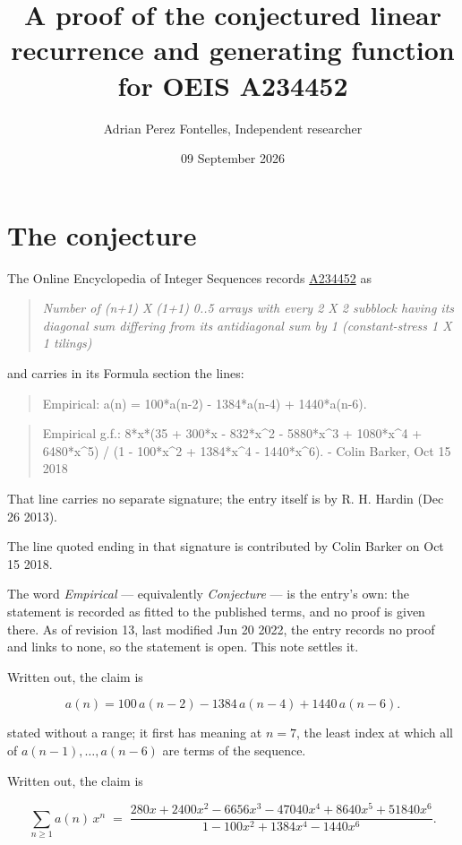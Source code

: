 \documentclass[11pt]{article}
\title{A proof of the conjectured linear recurrence and generating function for OEIS A234452}
\author{Adrian Perez Fontelles, Independent researcher}
\date{09 September 2026}
\theoremstyle{definition}
\begin{document}
\maketitle
\section{The conjecture}

The Online Encyclopedia of Integer Sequences records \href{https://oeis.org/A234452}{A234452} as

\begin{quote}\itshape Number of (n+1) X (1+1) 0..5 arrays with every 2 X 2 subblock having its diagonal sum differing from its antidiagonal sum by 1 (constant-stress 1 X 1 tilings)\end{quote}

and carries in its Formula section the lines:

\begin{quote}\ttfamily Empirical: a(n) = 100*a(n-2) - 1384*a(n-4) + 1440*a(n-6).\end{quote}

\begin{quote}\ttfamily Empirical g.f.: 8*x*(35 + 300*x - 832*x\textasciicircum{}2 - 5880*x\textasciicircum{}3 + 1080*x\textasciicircum{}4 + 6480*x\textasciicircum{}5) / (1 - 100*x\textasciicircum{}2 + 1384*x\textasciicircum{}4 - 1440*x\textasciicircum{}6). - Colin Barker, Oct 15 2018\end{quote}

That line carries no separate signature; the entry itself is by R. H. Hardin (Dec 26 2013).

The line quoted ending in that signature is contributed by Colin Barker on Oct 15 2018.

The word {\itshape Empirical} --- equivalently {\itshape Conjecture} --- is the entry's own: the statement is recorded as fitted to the published terms, and no proof is given there. As of revision 13, last modified Jun 20 2022, the entry records no proof and links to none, so the statement is open. This note settles it.

Written out, the claim is

\[a(n) = 100\,a(n-2) - 1384\,a(n-4) + 1440\,a(n-6).\]

stated without a range; it first has meaning at $n = 7$, the least index at which all of $a(n-1),\dots,a(n-6)$ are terms of the sequence.

Written out, the claim is

\[\sum_{n \ge 1} a(n)\,x^n \;=\; \frac{280x + 2400x^{2} - 6656x^{3} - 47040x^{4} + 8640x^{5} + 51840x^{6}}{1 - 100x^{2} + 1384x^{4} - 1440x^{6}}.\]
\end{document}
